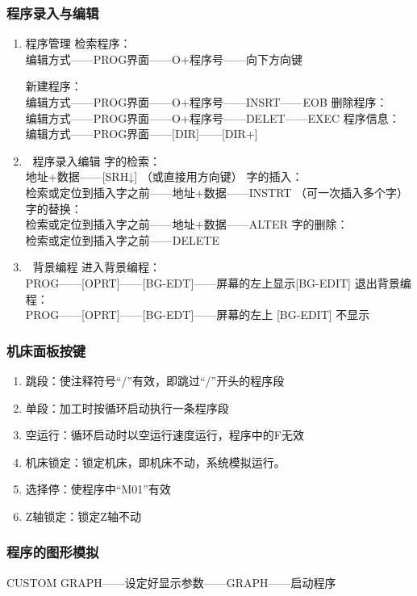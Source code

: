 \subsubsection{程序录入与编辑}
\begin{enumerate}[1、]
\item 	程序管理
\subitem 检索程序：\\编辑方式——PROG界面——O+程序号——向下方向键

\subitem 	新建程序：\\编辑方式——PROG界面——O+程序号——INSRT——EOB
\subitem  删除程序：\\编辑方式——PROG界面——O+程序号——DELET——EXEC
\subitem 程序信息：\\编辑方式——PROG界面——[DIR]——[DIR+]
\item 	程序录入编辑
\subitem 字的检索：\\地址+数据——[SRH↓]    （或直接用方向键）
\subitem 字的插入：\\检索或定位到插入字之前——地址+数据——INSTRT	（可一次插入多个字）
\subitem 字的替换：\\检索或定位到插入字之前——地址+数据——ALTER
\subitem 字的删除：\\检索或定位到插入字之前——DELETE
\item 	背景编程
\subitem 进入背景编程：\\PROG——[OPRT]——[BG-EDT]——屏幕的左上显示[BG-EDIT]
\subitem 退出背景编程：\\PROG——[OPRT]——[BG-EDT]——屏幕的左上 [BG-EDIT] 不显示
\end{enumerate}

\subsubsection{机床面板按键}
\begin{enumerate}[1、]
\item 跳段：使注释符号“/”有效，即跳过“/”开头的程序段
\item 单段：加工时按循环启动执行一条程序段
\item 空运行：循环启动时以空运行速度运行，程序中的F无效
\item 机床锁定：锁定机床，即机床不动，系统模拟运行。
\item 选择停：使程序中“M01”有效
\item Z轴锁定：锁定Z轴不动

\end{enumerate}

\subsubsection{程序的图形模拟}
CUSTOM GRAPH——设定好显示参数——GRAPH——启动程序

